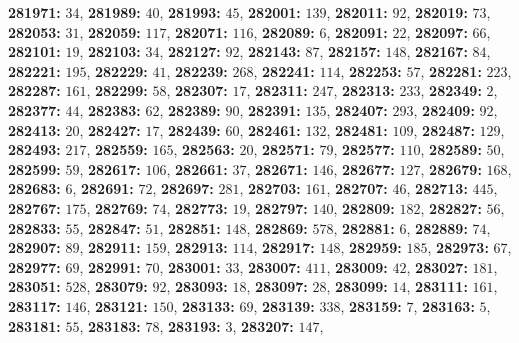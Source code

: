\textsf{\bfseries 281971:} $34$, \textsf{\bfseries 281989:} $40$, \textsf{\bfseries 281993:} $45$, \textsf{\bfseries 282001:} $139$, \textsf{\bfseries 282011:} $92$, \textsf{\bfseries 282019:} $73$, \textsf{\bfseries 282053:} $31$, \textsf{\bfseries 282059:} $117$, \textsf{\bfseries 282071:} $116$, \textsf{\bfseries 282089:} $6$, \textsf{\bfseries 282091:} $22$, \textsf{\bfseries 282097:} $66$, \textsf{\bfseries 282101:} $19$, \textsf{\bfseries 282103:} $34$, \textsf{\bfseries 282127:} $92$, \textsf{\bfseries 282143:} $87$, \textsf{\bfseries 282157:} $148$, \textsf{\bfseries 282167:} $84$, \textsf{\bfseries 282221:} $195$, \textsf{\bfseries 282229:} $41$, \textsf{\bfseries 282239:} $268$, \textsf{\bfseries 282241:} $114$, \textsf{\bfseries 282253:} $57$, \textsf{\bfseries 282281:} $223$, \textsf{\bfseries 282287:} $161$, \textsf{\bfseries 282299:} $58$, \textsf{\bfseries 282307:} $17$, \textsf{\bfseries 282311:} $247$, \textsf{\bfseries 282313:} $233$, \textsf{\bfseries 282349:} $2$, \textsf{\bfseries 282377:} $44$, \textsf{\bfseries 282383:} $62$, \textsf{\bfseries 282389:} $90$, \textsf{\bfseries 282391:} $135$, \textsf{\bfseries 282407:} $293$, \textsf{\bfseries 282409:} $92$, \textsf{\bfseries 282413:} $20$, \textsf{\bfseries 282427:} $17$, \textsf{\bfseries 282439:} $60$, \textsf{\bfseries 282461:} $132$, \textsf{\bfseries 282481:} $109$, \textsf{\bfseries 282487:} $129$, \textsf{\bfseries 282493:} $217$, \textsf{\bfseries 282559:} $165$, \textsf{\bfseries 282563:} $20$, \textsf{\bfseries 282571:} $79$, \textsf{\bfseries 282577:} $110$, \textsf{\bfseries 282589:} $50$, \textsf{\bfseries 282599:} $59$, \textsf{\bfseries 282617:} $106$, \textsf{\bfseries 282661:} $37$, \textsf{\bfseries 282671:} $146$, \textsf{\bfseries 282677:} $127$, \textsf{\bfseries 282679:} $168$, \textsf{\bfseries 282683:} $6$, \textsf{\bfseries 282691:} $72$, \textsf{\bfseries 282697:} $281$, \textsf{\bfseries 282703:} $161$, \textsf{\bfseries 282707:} $46$, \textsf{\bfseries 282713:} $445$, \textsf{\bfseries 282767:} $175$, \textsf{\bfseries 282769:} $74$, \textsf{\bfseries 282773:} $19$, \textsf{\bfseries 282797:} $140$, \textsf{\bfseries 282809:} $182$, \textsf{\bfseries 282827:} $56$, \textsf{\bfseries 282833:} $55$, \textsf{\bfseries 282847:} $51$, \textsf{\bfseries 282851:} $148$, \textsf{\bfseries 282869:} $578$, \textsf{\bfseries 282881:} $6$, \textsf{\bfseries 282889:} $74$, \textsf{\bfseries 282907:} $89$, \textsf{\bfseries 282911:} $159$, \textsf{\bfseries 282913:} $114$, \textsf{\bfseries 282917:} $148$, \textsf{\bfseries 282959:} $185$, \textsf{\bfseries 282973:} $67$, \textsf{\bfseries 282977:} $69$, \textsf{\bfseries 282991:} $70$, \textsf{\bfseries 283001:} $33$, \textsf{\bfseries 283007:} $411$, \textsf{\bfseries 283009:} $42$, \textsf{\bfseries 283027:} $181$, \textsf{\bfseries 283051:} $528$, \textsf{\bfseries 283079:} $92$, \textsf{\bfseries 283093:} $18$, \textsf{\bfseries 283097:} $28$, \textsf{\bfseries 283099:} $14$, \textsf{\bfseries 283111:} $161$, \textsf{\bfseries 283117:} $146$, \textsf{\bfseries 283121:} $150$, \textsf{\bfseries 283133:} $69$, \textsf{\bfseries 283139:} $338$, \textsf{\bfseries 283159:} $7$, \textsf{\bfseries 283163:} $5$, \textsf{\bfseries 283181:} $55$, \textsf{\bfseries 283183:} $78$, \textsf{\bfseries 283193:} $3$, \textsf{\bfseries 283207:} $147$, 
